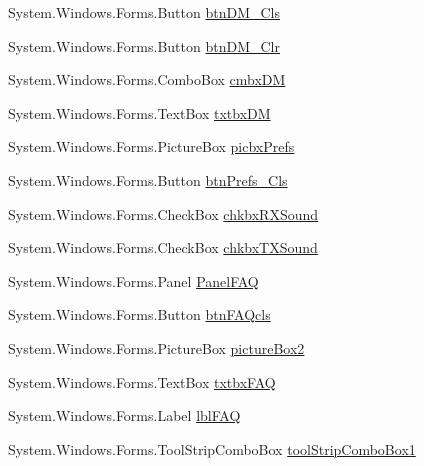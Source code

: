 \begin{DoxyCompactItemize}
\-System.\-Windows.\-Forms.\-Button \hyperlink{class_sr_p___classroom_inq_1_1frm_classrrom_inq_a2e01fdc50400702fd6df6d5d785ddb4d}{btn\-D\-M\-\_\-\-Cls}
\item 
\-System.\-Windows.\-Forms.\-Button \hyperlink{class_sr_p___classroom_inq_1_1frm_classrrom_inq_a81852ce0a99da9e3b5838befcb9daedc}{btn\-D\-M\-\_\-\-Clr}
\item 
\-System.\-Windows.\-Forms.\-Combo\-Box \hyperlink{class_sr_p___classroom_inq_1_1frm_classrrom_inq_a3d1c3cd1ef0f02e6e927a4fd741672e5}{cmbx\-D\-M}
\item 
\-System.\-Windows.\-Forms.\-Text\-Box \hyperlink{class_sr_p___classroom_inq_1_1frm_classrrom_inq_aec9084c69e8f5c7398f201a074db8550}{txtbx\-D\-M}
\item 
\-System.\-Windows.\-Forms.\-Picture\-Box \hyperlink{class_sr_p___classroom_inq_1_1frm_classrrom_inq_ad71fe1b1dd90eb59594ecf4a175e1b03}{picbx\-Prefs}
\item 
\-System.\-Windows.\-Forms.\-Button \hyperlink{class_sr_p___classroom_inq_1_1frm_classrrom_inq_ab11e101a873395b24e8894ac84d7d318}{btn\-Prefs\-\_\-\-Cls}
\item 
\-System.\-Windows.\-Forms.\-Check\-Box \hyperlink{class_sr_p___classroom_inq_1_1frm_classrrom_inq_af7626aaecde3bb58d5cfee3957410aa8}{chkbx\-R\-X\-Sound}
\item 
\-System.\-Windows.\-Forms.\-Check\-Box \hyperlink{class_sr_p___classroom_inq_1_1frm_classrrom_inq_a63062a732e40b85f40aa3ba57d80223a}{chkbx\-T\-X\-Sound}
\item 
\-System.\-Windows.\-Forms.\-Panel \hyperlink{class_sr_p___classroom_inq_1_1frm_classrrom_inq_ae18ea5d89fce8227797626585e3e2a1a}{\-Panel\-F\-A\-Q}
\item 
\-System.\-Windows.\-Forms.\-Button \hyperlink{class_sr_p___classroom_inq_1_1frm_classrrom_inq_a1c53d39fe22e25d8c00aa7d8c97eb9a8}{btn\-F\-A\-Qcls}
\item 
\-System.\-Windows.\-Forms.\-Picture\-Box \hyperlink{class_sr_p___classroom_inq_1_1frm_classrrom_inq_aeb268a5866f810521414bd3fd047ca72}{picture\-Box2}
\item 
\-System.\-Windows.\-Forms.\-Text\-Box \hyperlink{class_sr_p___classroom_inq_1_1frm_classrrom_inq_a891afdbfba3ee4c1b690b938693ecabe}{txtbx\-F\-A\-Q}
\item 
\-System.\-Windows.\-Forms.\-Label \hyperlink{class_sr_p___classroom_inq_1_1frm_classrrom_inq_ab8a84057dad27dc977240ce7f96187c3}{lbl\-F\-A\-Q}
\item 
\-System.\-Windows.\-Forms.\-Tool\-Strip\-Combo\-Box \hyperlink{class_sr_p___classroom_inq_1_1frm_classrrom_inq_a0488696265840798a7bfd3cc7475f0af}{tool\-Strip\-Combo\-Box1}

\end{DoxyCompactItemize}
